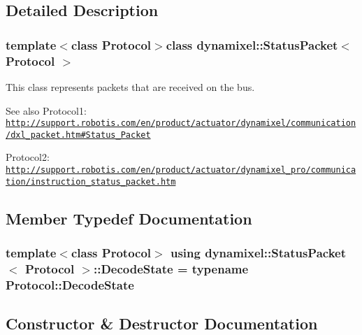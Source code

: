\subsection{Detailed Description}
\subsubsection*{template$<$class Protocol$>$class dynamixel\+::\+Status\+Packet$<$ Protocol $>$}

This class represents packets that are received on the bus.

\begin{DoxySeeAlso}{See also}
Protocol1\+: \href{http://support.robotis.com/en/product/actuator/dynamixel/communication/dxl_packet.htm#Status_Packet}{\tt http\+://support.\+robotis.\+com/en/product/actuator/dynamixel/communication/dxl\+\_\+packet.\+htm\#\+Status\+\_\+\+Packet}

Protocol2\+: \href{http://support.robotis.com/en/product/actuator/dynamixel_pro/communication/instruction_status_packet.htm}{\tt http\+://support.\+robotis.\+com/en/product/actuator/dynamixel\+\_\+pro/communication/instruction\+\_\+status\+\_\+packet.\+htm} 
\end{DoxySeeAlso}


\subsection{Member Typedef Documentation}
\hypertarget{classdynamixel_1_1_status_packet_a8503d43f735f141c2faa37aaac8abbc6}{}
\subsubsection[{Decode\+State}]{\setlength{\rightskip}{0pt plus 5cm}template$<$class Protocol$>$ using {\bf dynamixel\+::\+Status\+Packet}$<$ Protocol $>$\+::{\bf Decode\+State} =  typename Protocol\+::\+Decode\+State}\label{classdynamixel_1_1_status_packet_a8503d43f735f141c2faa37aaac8abbc6}


\subsection{Constructor \& Destructor Documentation}
\hypertarget{classdynamixel_1_1_status_packet_a569c906dc127b35054910ee24ac3106d}{}
